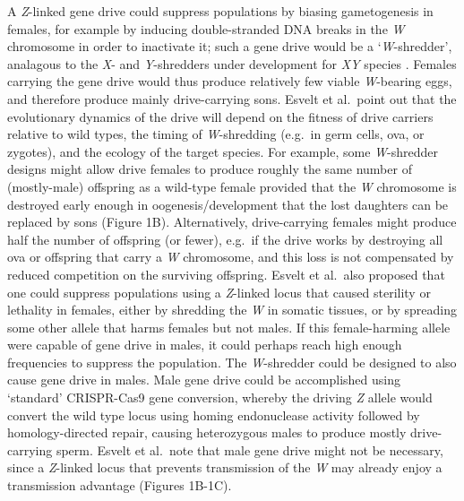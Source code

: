 \documentclass[]{rsos}%
\begin{document}
A \emph{Z}-linked gene drive could suppress populations by biasing
gametogenesis in females, for example by inducing double-stranded DNA
breaks in the \emph{W} chromosome in order to inactivate it; such a gene
drive would be a `\emph{W}-shredder', analagous to the \emph{X}- and
\emph{Y}-shredders under development for \emph{XY} species
\citep{windbichler2008ta, north2013mo, galizi2014sy, burt2018se, papathanos2018re, prowse2019}.
Females carrying the gene drive would thus produce relatively few viable
\emph{W}-bearing eggs, and therefore produce mainly drive-carrying sons.
Esvelt et al.~point out that the evolutionary dynamics of the drive will
depend on the fitness of drive carriers relative to wild types, the
timing of \emph{W}-shredding (e.g.~in germ cells, ova, or zygotes), and
the ecology of the target species. For example, some \emph{W}-shredder
designs might allow drive females to produce roughly the same number of
(mostly-male) offspring as a wild-type female provided that the \emph{W}
chromosome is destroyed early enough in oogenesis/development that the
lost daughters can be replaced by sons (Figure 1B). Alternatively,
drive-carrying females might produce half the number of offspring (or
fewer), e.g.~if the drive works by destroying all ova or offspring that
carry a \emph{W} chromosome, and this loss is not compensated by reduced
competition on the surviving offspring. Esvelt et al.~also proposed that
one could suppress populations using a \emph{Z}-linked locus that caused
sterility or lethality in females, either by shredding the \emph{W} in
somatic tissues, or by spreading some other allele that harms females
but not males. If this female-harming allele were capable of gene drive
in males, it could perhaps reach high enough frequencies to suppress the
population. The \emph{W}-shredder could be designed to also cause gene
drive in males. Male gene drive could be accomplished using `standard'
CRISPR-Cas9 gene conversion, whereby the driving \emph{Z} allele would
convert the wild type locus using homing endonuclease activity followed
by homology-directed repair, causing heterozygous males to produce
mostly drive-carrying sperm. Esvelt et al.~note that male gene drive
might not be necessary, since a \emph{Z}-linked locus that prevents
transmission of the \emph{W} may already enjoy a transmission advantage
(Figures 1B-1C).
\end{document}
